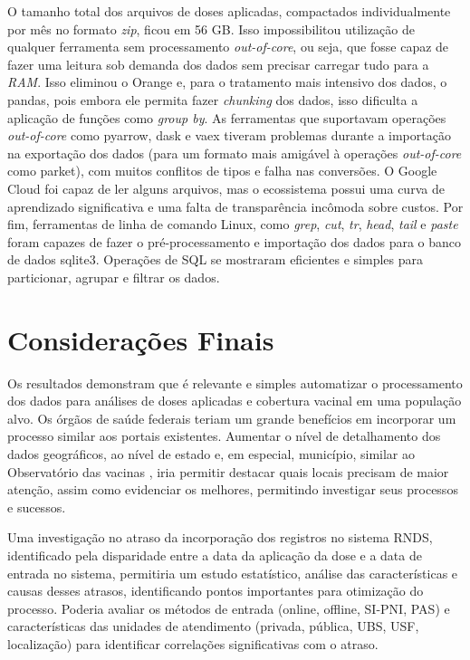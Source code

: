 \documentclass[12pt]{article}
\begin{document}
O tamanho total dos arquivos de doses aplicadas, compactados individualmente por mês no formato \emph{zip}, ficou em 56 GB. Isso impossibilitou utilização de qualquer ferramenta sem processamento \emph{out-of-core}, ou seja, que fosse capaz de fazer uma leitura sob demanda dos dados sem precisar carregar tudo para a \emph{RAM}. Isso eliminou o Orange e, para o tratamento mais intensivo dos dados, o pandas, pois embora ele permita fazer \emph{chunking} dos dados, isso dificulta a aplicação de funções como \emph{group by}. As ferramentas que suportavam operações \emph{out-of-core} como pyarrow, dask e vaex tiveram problemas durante a importação na exportação dos dados (para um formato mais amigável à operações \emph{out-of-core} como parket), com muitos conflitos de tipos e falha nas conversões. O Google Cloud foi capaz de ler alguns arquivos, mas o ecossistema possui uma curva de aprendizado significativa e uma falta de transparência incômoda sobre custos. Por fim, ferramentas de linha de comando Linux, como \emph{grep}, \emph{cut}, \emph{tr}, \emph{head}, \emph{tail} e \emph{paste} foram capazes de fazer o pré-processamento e importação dos dados para o banco de dados sqlite3. Operações de SQL se mostraram eficientes e simples para particionar, agrupar e filtrar os dados.

\section{Considerações Finais} \label{sec:consideracoes finais}
Os resultados demonstram que é relevante e simples automatizar o processamento dos dados para análises de doses aplicadas e cobertura vacinal em uma população alvo. Os órgãos de saúde federais teriam um grande benefícios em incorporar um processo similar aos portais existentes. Aumentar o nível de detalhamento dos dados geográficos, ao nível de estado e, em especial, município, similar ao Observatório das vacinas \cite{observatorio_das_vacinas_mapa_2020}, iria permitir destacar quais locais precisam de maior atenção, assim como evidenciar os melhores, permitindo investigar seus processos e sucessos.

Uma investigação no atraso da incorporação dos registros no sistema RNDS, identificado pela disparidade entre a data da aplicação da dose e a data de entrada no sistema, permitiria um estudo estatístico, análise das características e causas desses atrasos, identificando pontos importantes para otimização do processo. Poderia avaliar os métodos de entrada (online, offline, SI-PNI, PAS) e características das unidades de atendimento (privada, pública, UBS, USF, localização) para identificar correlações significativas com o atraso.
\end{document}
